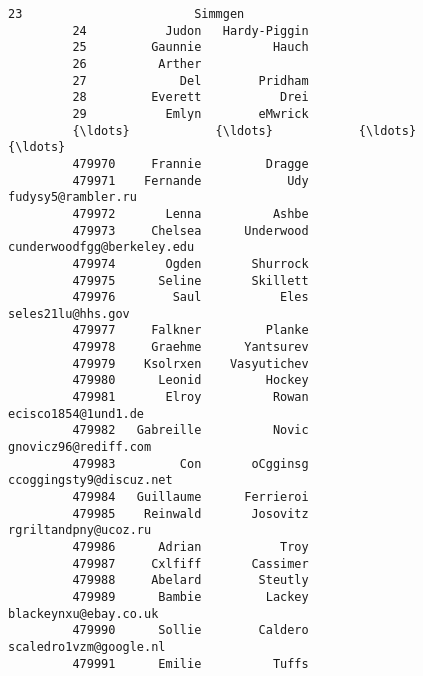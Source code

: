 \documentclass[11pt]{article}
\begin{document}
\begin{Verbatim}[commandchars=\\\{\}]
         23                        Simmgen                                             
         24           Judon   Hardy-Piggin                                             
         25         Gaunnie          Hauch                                             
         26          Arther                                                            
         27             Del        Pridham                                             
         28         Everett           Drei                                             
         29           Emlyn        eMwrick                                             
         {\ldots}            {\ldots}            {\ldots}                                       {\ldots}   
         479970     Frannie         Dragge                                             
         479971    Fernande            Udy                        fudysy5@rambler.ru   
         479972       Lenna          Ashbe                                             
         479973     Chelsea      Underwood                cunderwoodfgg@berkeley.edu   
         479974       Ogden       Shurrock                                             
         479975      Seline       Skillett                                             
         479976        Saul           Eles                         seles21lu@hhs.gov   
         479977     Falkner         Planke                                             
         479978     Graehme      Yantsurev                                             
         479979    Ksolrxen    Vasyutichev                                             
         479980      Leonid         Hockey                                             
         479981       Elroy          Rowan                       ecisco1854@1und1.de   
         479982   Gabreille          Novic                      gnovicz96@rediff.com   
         479983         Con       oCgginsg                   ccoggingsty9@discuz.net   
         479984   Guillaume      Ferrieroi                                             
         479985    Reinwald       Josovitz                      rgriltandpny@ucoz.ru   
         479986      Adrian           Troy                                             
         479987     Cxlfiff       Cassimer                                             
         479988     Abelard        Steutly                                             
         479989      Bambie         Lackey                     blackeynxu@ebay.co.uk   
         479990      Sollie        Caldero                    scaledro1vzm@google.nl   
         479991      Emilie          Tuffs                                             

\end{Verbatim}
\end{document}
